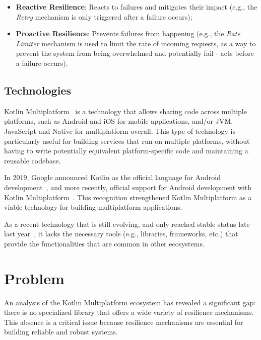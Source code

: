 \begin{itemize}
    \item \textbf{Reactive Resilience}: Reacts to failures and mitigates their impact (e.g., the \textit{Retry} mechanism is only triggered after a failure occurs);
    \item \textbf{Proactive Resilience}: Prevents failures from happening (e.g., the \textit{Rate Limiter} mechanism is used to limit the rate of incoming requests, as a way to prevent the system from being overwhelmed and potentially fail - acts before a failure occurs).
\end{itemize}

\subsection{Technologies}\label{subsec:technologies}

Kotlin Multiplatform~\cite{kotlin-multiplatform} is a technology that allows sharing code across multiple platforms,
such as Android and iOS for mobile applications, and/or JVM, JavaScript and Native for multiplatform overall.
This type of technology is particularly useful for building services that run on multiple platforms,
without having to write potentially equivalent platform-specific code and maintaining a reusable codebase.

In 2019, Google announced Kotlin as the official language for Android development~\cite{google-android-kotlin},
and more recently,
official support for Android development with Kotlin Multiplatform~\cite{android-kotlin-multiplatform, google-kotlin-multiplatform}.
This recognition strengthened Kotlin Multiplatform as a viable technology for building multiplatform applications.

As a recent technology that is still evolving,
and only reached stable status late last year~\cite{kotlin-multiplatform-stable},
it lacks the necessary tools (e.g., libraries, frameworks, etc.)
that provide the functionalities that are common in other ecosystems.


\section{Problem}\label{sec:problem}

An analysis of the Kotlin Multiplatform ecosystem has revealed a significant gap:
there is no specialized library that offers a wide variety of resilience mechanisms.
This absence is a critical issue because resilience mechanisms are essential for building reliable and robust systems.

